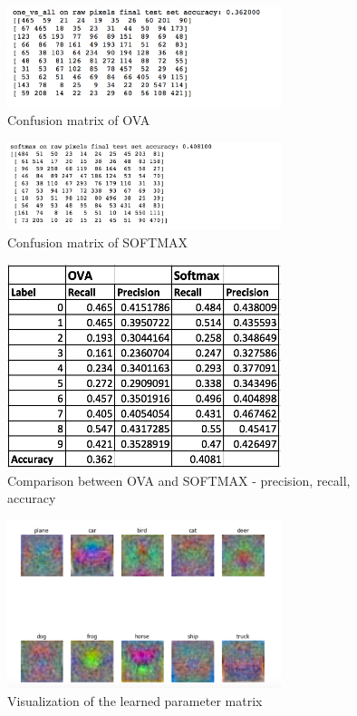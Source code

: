 \documentclass[12pt]{article}
\begin{document}
\begin{figure}[!tpb]
	\centerline{\includegraphics[width=80mm]{OVA_conf}}
	\caption{\label{fig1}
		Confusion matrix of OVA }
\end{figure}

\begin{figure}[!tpb]
	\centerline{\includegraphics[width=80mm]{SOFTMAX_conf}}
	\caption{\label{fig2}
		Confusion matrix of SOFTMAX}
\end{figure}

\begin{figure}[!tpb]
	\centerline{\includegraphics[width=80mm]{precision_recall.png}}
	\caption{\label{fig3}
		Comparison between OVA and SOFTMAX - precision, recall, accuracy}
\end{figure}

\begin{figure}[!tpb]
	\centerline{\includegraphics[width=80mm]{CIFAR-10.png}}
	\caption{\label{fig4}
		Visualization of the learned parameter matrix}
\end{figure}
\end{document}
